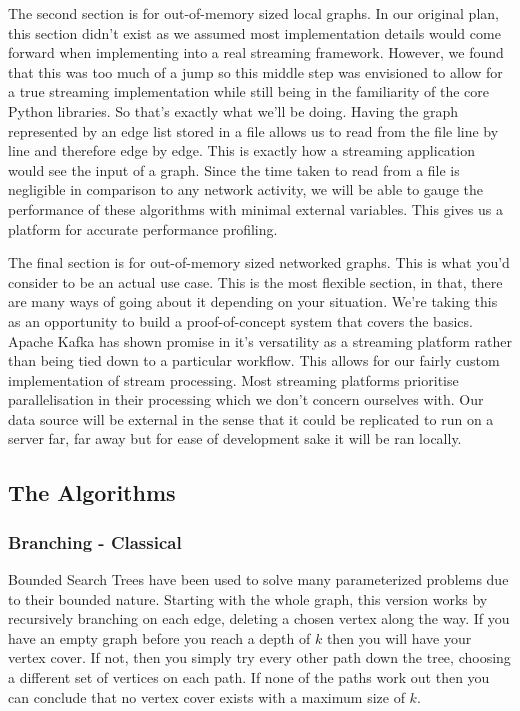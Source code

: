 The second section is for out-of-memory sized local graphs. In our
original plan, this section didn't exist as we assumed most
implementation details would come forward when implementing into a real
streaming framework. However, we found that this was too much of a jump
so this middle step was envisioned to allow for a true streaming
implementation while still being in the familiarity of the core Python
libraries. So that's exactly what we'll be doing. Having the graph
represented by an edge list stored in a file allows us to read from the
file line by line and therefore edge by edge. This is exactly how a
streaming application would see the input of a graph. Since the time
taken to read from a file is negligible in comparison to any network
activity, we will be able to gauge the performance of these algorithms
with minimal external variables. This gives us a platform for accurate
performance profiling.

The final section is for out-of-memory sized networked graphs. This is
what you'd consider to be an actual use case. This is the most flexible
section, in that, there are many ways of going about it depending on
your situation. We're taking this as an opportunity to build a
proof-of-concept system that covers the basics. Apache Kafka has shown
promise in it's versatility as a streaming platform rather than being
tied down to a particular workflow. This allows for our fairly custom
implementation of stream processing. Most streaming platforms prioritise
parallelisation in their processing which we don't concern ourselves
with. Our data source will be external in the sense that it could be
replicated to run on a server far, far away but for ease of development
sake it will be ran locally.

\subsection{The Algorithms}

\subsubsection{Branching - Classical}

Bounded Search Trees have been used to solve many parameterized problems
due to their bounded nature. Starting with the whole graph, this version
works by recursively branching on each edge, deleting a chosen vertex
along the way. If you have an empty graph before you reach a depth of
\(k\) then you will have your vertex cover. If not, then you simply try
every other path down the tree, choosing a different set of vertices on
each path. If none of the paths work out then you can conclude that no
vertex cover exists with a maximum size of \(k\).

